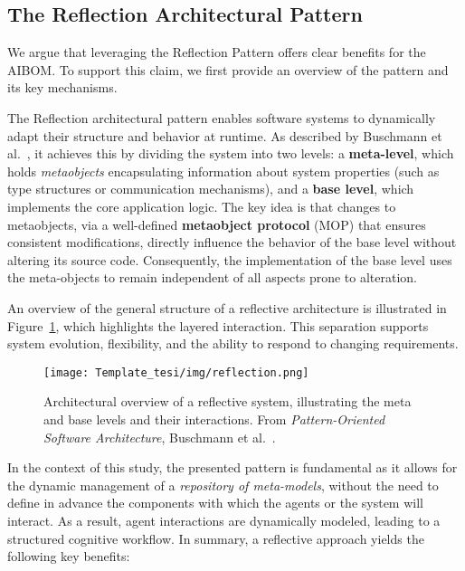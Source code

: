 \subsection{The Reflection Architectural Pattern}
\label{sec:reflection}

We argue that leveraging the Reflection Pattern offers clear benefits for the AIBOM. To support this claim, we first provide an overview of the pattern and its key mechanisms.

The Reflection architectural pattern enables software systems to dynamically adapt their structure and behavior at runtime. As described by Buschmann et al.~\cite{Buschmann1996}, it achieves this by dividing the system into two levels: a \textbf{meta-level}, which holds \textit{metaobjects} encapsulating information about system properties (such as type structures or communication mechanisms), and a \textbf{base level}, which implements the core application logic. The key idea is that changes to metaobjects, via a well-defined \textbf{metaobject protocol} (MOP) that ensures consistent modifications, directly influence the behavior of the base level without altering its source code. Consequently, the implementation of the base level uses the meta-objects to remain independent of all aspects prone to alteration.

An overview of the general structure of a reflective architecture is illustrated in Figure~\ref{fig:reflection}, which highlights the layered interaction. This separation supports system evolution, flexibility, and the ability to respond to changing requirements. 

\begin{figure}[h]
    \centering
    \texttt{[image: Template\_tesi/img/reflection.png]}
    \caption{Architectural overview of a reflective system, illustrating the meta and base levels and their interactions. From \textit{Pattern-Oriented Software Architecture}, Buschmann et al.~\cite{Buschmann1996}.}
    \label{fig:reflection}
\end{figure}

In the context of this study, the presented pattern is fundamental as it allows for the dynamic management of a \textit{repository of meta-models}, without the need to define in advance the components with which the agents or the system will interact. As a result, agent interactions are dynamically modeled, leading to a structured cognitive workflow. In summary, a reflective approach yields the following key benefits:


